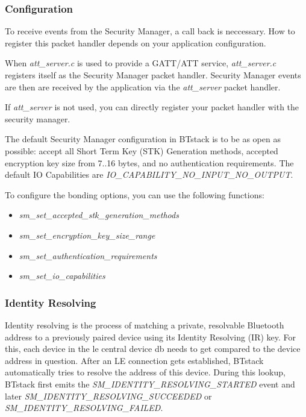 \subsubsection{Configuration}

To receive events from the Security Manager, a call back is neccessary. How to register this packet handler depends on your application configuration. 

When \emph{att\_server.c} is used to provide a GATT/ATT service, \emph{att\_server.c} registers itself as the Security Manager packet handler. Security Manager events are then are received by the application via the \emph{att\_server} packet handler.

If \emph{att\_server} is not used, you can directly register your packet handler with the security manager. 

The default Security Manager configuration in BTstack is to be as open as possible: accept all Short Term Key (STK) Generation methods, accepted encryption key size from 7..16 bytes, and no authentication requirements. The default IO Capabilities are \emph{IO\_CAPABILITY\_NO\_INPUT\_NO\_OUTPUT}.

To configure the bonding options, you can use the following functions:
\begin{itemize}
\item \emph{sm\_set\_accepted\_stk\_generation\_methods}
\item \emph{sm\_set\_encryption\_key\_size\_range}
\item \emph{sm\_set\_authentication\_requirements}
\item \emph{sm\_set\_io\_capabilities}
\end{itemize}

\subsubsection{Identity Resolving}

Identity resolving is the process of matching a private, resolvable Bluetooth address to a previously paired device using its Identity Resolving (IR) key. For this, each device in the le central device db needs to get compared to the device address in question. After an LE connection gets established, BTstack automatically tries to resolve the address of this device. During this lookup, BTstack first emits the \emph{SM\_IDENTITY\_RESOLVING\_STARTED} event and later \emph{SM\_IDENTITY\_RESOLVING\_SUCCEEDED} or \emph{SM\_IDENTITY\_RESOLVING\_FAILED}.

